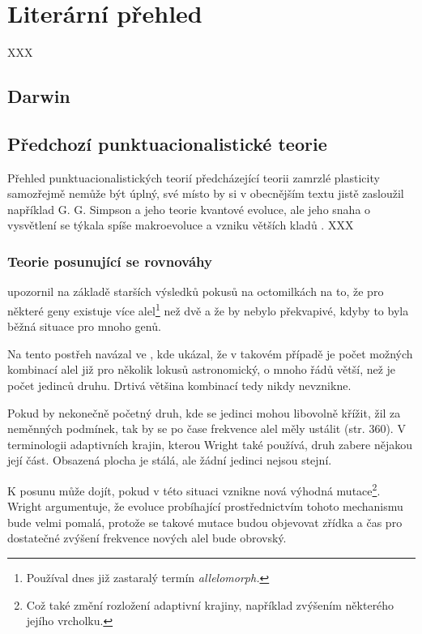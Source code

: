\chapter{Literární přehled}


XXX

%
\section{Darwin}

\section{Předchozí punktuacionalistické teorie}

Přehled punktuacionalistických teorií předcházející teorii zamrzlé plasticity samozřejmě nemůže být úplný, své místo
by si v obecnějším textu jistě zasloužil například G. G. Simpson a jeho teorie kvantové evoluce, ale jeho snaha o
vysvětlení se týkala spíše makroevoluce a vzniku větších kladů \citep[str. 529]{gould2002structure}. XXX

\subsection{Teorie posunující se rovnováhy}

\citet[str. 104--105]{wright1931} upozornil na základě starších výsledků pokusů na octomilkách na to, že pro některé
geny existuje více alel\footnote{Používal dnes již zastaralý termín \textit{allelomorph.}} než dvě a že by nebylo
překvapivé, kdyby to byla běžná situace pro mnoho genů.

Na tento postřeh navázal ve \citet[str. 356]{wright1932}, kde ukázal, že v takovém případě je počet možných kombinací
alel již pro několik lokusů astronomický, o mnoho řádů větší, než je počet jedinců druhu. Drtivá většina kombinací
tedy nikdy nevznikne.

Pokud by nekonečně početný druh, kde se jedinci mohou libovolně křížit, žil za neměnných podmínek, tak by se po čase
frekvence alel měly ustálit (str. 360). V terminologii adaptivních krajin, kterou Wright také používá, druh
zabere nějakou její část. Obsazená plocha je stálá, ale žádní jedinci nejsou stejní.

K posunu může dojít, pokud v této situaci vznikne nová výhodná mutace\footnote{Což také změní rozložení adaptivní
krajiny, například zvýšením některého jejího vrcholku.}. Wright argumentuje, že evoluce probíhající prostřednictvím
tohoto mechanismu bude velmi pomalá, protože se takové mutace budou objevovat zřídka a čas pro dostatečné zvýšení
frekvence nových alel bude obrovský.

